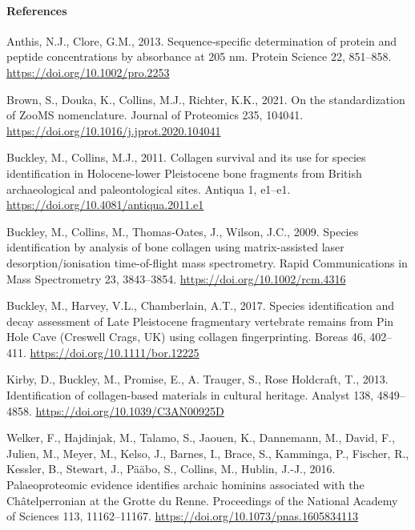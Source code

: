 \documentclass[
]{article}
\newlength{\cslhangindent}
\newlength{\cslentryspacingunit} %
\newenvironment{CSLReferences}[2] %
 {%
  \setlength{\parindent}{0pt}
  \ifodd #1
  \let\oldpar\par
  \def\par{\hangindent=\cslhangindent\oldpar}
  \fi
  \setlength{\parskip}{#2\cslentryspacingunit}
 }%
 {}
\begin{document}
\newpage

\hypertarget{references}{%
\paragraph*{References}\label{references}}

\hfill\break

\hypertarget{refs}{}
\begin{CSLReferences}{1}{0}
\leavevmode{}%
Anthis, N.J., Clore, G.M., 2013. Sequence‐specific determination of protein and peptide concentrations by absorbance at 205 nm. Protein Science 22, 851--858. \url{https://doi.org/10.1002/pro.2253}

\leavevmode{}%
Brown, S., Douka, K., Collins, M.J., Richter, K.K., 2021. On the standardization of {ZooMS} nomenclature. Journal of Proteomics 235, 104041. \url{https://doi.org/10.1016/j.jprot.2020.104041}

\leavevmode{}%
Buckley, M., Collins, M.J., 2011. Collagen survival and its use for species identification in {Holocene-lower Pleistocene} bone fragments from {British} archaeological and paleontological sites. Antiqua 1, e1--e1. \url{https://doi.org/10.4081/antiqua.2011.e1}

\leavevmode{}%
Buckley, M., Collins, M., Thomas‐Oates, J., Wilson, J.C., 2009. Species identification by analysis of bone collagen using matrix-assisted laser desorption/ionisation time-of-flight mass spectrometry. Rapid Communications in Mass Spectrometry 23, 3843--3854. \url{https://doi.org/10.1002/rcm.4316}

\leavevmode{}%
Buckley, M., Harvey, V.L., Chamberlain, A.T., 2017. Species identification and decay assessment of {Late Pleistocene} fragmentary vertebrate remains from {Pin Hole Cave} ({Creswell Crags}, {UK}) using collagen fingerprinting. Boreas 46, 402--411. \url{https://doi.org/10.1111/bor.12225}

\leavevmode{}%
Kirby, D., Buckley, M., Promise, E., A. Trauger, S., Rose Holdcraft, T., 2013. Identification of collagen-based materials in cultural heritage. Analyst 138, 4849--4858. \url{https://doi.org/10.1039/C3AN00925D}

\leavevmode{}%
Welker, F., Hajdinjak, M., Talamo, S., Jaouen, K., Dannemann, M., David, F., Julien, M., Meyer, M., Kelso, J., Barnes, I., Brace, S., Kamminga, P., Fischer, R., Kessler, B., Stewart, J., Pääbo, S., Collins, M., Hublin, J.-J., 2016. Palaeoproteomic evidence identifies archaic hominins associated with the {Châtelperronian} at the {Grotte} du {Renne}. Proceedings of the National Academy of Sciences 113, 11162--11167. \url{https://doi.org/10.1073/pnas.1605834113}

\end{CSLReferences}
\end{document}
